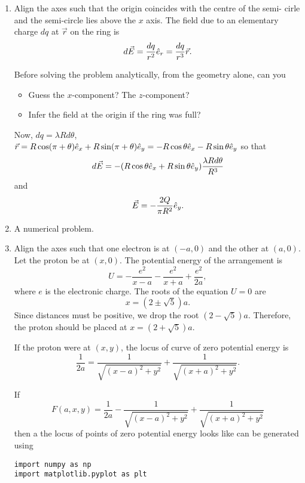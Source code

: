\documentclass{article}
\begin{document}
\begin{enumerate}
\item Align the axes such that the origin coincides with the centre of the semi-
cirle and the semi-circle lies above the $x$ axis. The field due to an elementary
charge $dq$ at $\vec{r}$ on the ring is
\[
d\vec{E} = \frac{dq}{r^2}\hat{e}_{r} = \frac{dq}{r^3}\vec{r}.
\]

Before solving the problem analytically, from the geometry alone, can you
\begin{itemize}
\item Guess the $x$-component? The $z$-component?
\item Infer the field at the origin if the ring was full?
\end{itemize}
Now, $dq = \lambda Rd\theta$, $\vec{r} = R\cos(\pi + \theta)\hat{e}_{x} + R\sin(\pi + \theta)\hat{e}_{y}
= -R\cos\theta\hat{e}_{x} - R\sin\theta\hat{e}_{y}$ so
that
\[
d\vec{E} = -(R\cos\theta\hat{e}_{x} + R\sin\theta\hat{e}_{y})\frac{\lambda R d\theta}{R^3}
\]
and
\begin{equation}\label{e9}
\vec{E} = -\frac{2Q}{\pi R^2}\hat{e}_{y}.
\end{equation}

\item A numerical problem.

\item Align the axes such that one electron is at $(-a, 0)$ and the other at 
$(a, 0)$. Let the proton be at $(x, 0)$. The potential energy of the arrangement
is
\begin{equation}\label{e10}
U = -\frac{e^2}{x - a} - \frac{e^2}{x + a} + \frac{e^2}{2a},
\end{equation}
where $e$ is the electronic charge. The roots of the equation $U = 0$ are
\begin{equation}\label{e11}
x = (2 \pm \sqrt{5})a.
\end{equation}
Since distances must be positive, we drop the root $(2 - \sqrt{5})a$. Therefore,
the proton should be placed at $x = (2 + \sqrt{5})a$.

If the proton were at $(x, y)$, the locus of curve of zero potential energy is
\begin{equation}\label{e12}
\frac{1}{2a} = \frac{1}{\sqrt{(x - a)^2 + y^2}} + \frac{1}{\sqrt{(x + a)^2 + y^2}}.
\end{equation}

If
\begin{equation}\label{e13}
F(a, x, y) = \frac{1}{2a} - \frac{1}{\sqrt{(x - a)^2 + y^2}} + \frac{1}{\sqrt{(x + a)^2 + y^2}}
\end{equation}
then a the locus of points of zero potential energy looks like can be generated using
\begin{verbatim}
import numpy as np
import matplotlib.pyplot as plt


\end{verbatim}
\end{enumerate}
\end{document}
